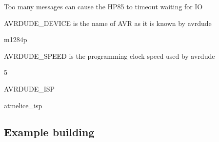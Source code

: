 \begin{DoxyItemize}
\begin{DoxyItemize}
\begin{DoxyItemize}
\begin{DoxyItemize}
\begin{DoxyItemize}
\item Too many messages can cause the H\+P85 to timeout waiting for IO
\end{DoxyItemize}
\end{DoxyItemize}
\end{DoxyItemize}
\item A\+V\+R\+D\+U\+D\+E\+\_\+\+D\+E\+V\+I\+CE is the name of A\+VR as it is known by avrdude
\begin{DoxyItemize}
\item m1284p
\end{DoxyItemize}
\item A\+V\+R\+D\+U\+D\+E\+\_\+\+S\+P\+E\+ED is the programming clock speed used by avrdude
\begin{DoxyItemize}
\item 5
\end{DoxyItemize}
\item A\+V\+R\+D\+U\+D\+E\+\_\+\+I\+SP
\begin{DoxyItemize}
\item atmelice\+\_\+isp
\end{DoxyItemize}
\end{DoxyItemize}
\end{DoxyItemize}

\subsection*{Example building}


